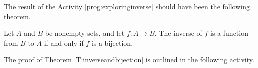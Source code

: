 \begin{comment}

\ActivitySolution

	\ba

	\item We reverse each ordered pair to obtain the ordered pairs for the inverse. So 
	\[f^{-1} = \{(r,a), (p,b), (q,c)\}, \ g^{-1} = \{(p,a), (q,b), (p,c)\}, \ h^{-1} = \{(p,a), (q,b), (r,c), (q,d)\}.\]

	\item 
		\begin{enumerate}[i.] 
		\item Since $f^{-1}$ contains no ordered pairs with the same first coordinate, $f^{-1}$ defines a function. 

		\item The fact that $(p,a)$ and $(p,c)$ are in $g^{-1}$ means that $g^{-1}$ is not a function. 

		\item Since $(q,b)$ and $(q,d)$ are in $h^{ - 1} $, $h^{-1}$ is not a function.Explain.

		\end{enumerate}

	\item Suppose $f$ is a function from $A$ to $B$. For $f^{-1}$ to define a function, there can be no ordered pairs of the form $(a,b)$ and $(c,b)$ in $f$. That is, if $(x,y)$ and $(w,y)$ are in $f$, then $x=w$. If $f^{-1}$ is to be a function from $B$ to $A$, then for each $b \in B$ there must exist a pair $(a,b) \in f$. In other words, for $f^{-1}$ to be a function from $B$ to $A$, then $f$ has to be both an injection and a surjection. 

	\ea

\end{comment}

The result of the Activity \ref{prog:exploringinverse} should have been the following theorem.

\begin{theorem} \label{T:inverseandbijection}
Let  $A$  and  $B$  be nonempty sets, and let  $f: A \to B$.  The inverse of  $f$ is a function from  $B$  to  $A$  if and only if  $f$  is a bijection.  
\end{theorem}

The proof of Theorem \ref{T:inverseandbijection} is outlined in the following activity. 

